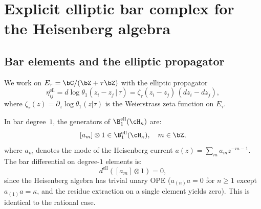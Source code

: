 \section{Explicit elliptic bar complex for the Heisenberg algebra}
\label{sec:elliptic-bar-heisenberg}

\subsection{Bar elements and the elliptic propagator}
\label{subsec:elliptic-bar-elements}

We work on $E_\tau = \bC / (\bZ + \tau\bZ)$ with the elliptic
propagator
\begin{equation}\label{eq:ell-propagator}
\eta_{ij}^{\mathrm{ell}}
= d\log\theta_1(z_i - z_j \,|\, \tau)
= \zeta_\tau(z_i - z_j)\,(dz_i - dz_j),
\end{equation}
where $\zeta_\tau(z) = \partial_z \log\theta_1(z|\tau)$ is the
Weierstrass zeta function on $E_\tau$.

\begin{computation}\label{comp:ell-bar-deg1}
In bar degree~$1$, the generators of $\B^{\mathrm{ell}}_1(\cH_\kappa)$
are:
\[
[a_m] \otimes 1 \in \B^{\mathrm{ell}}_1(\cH_\kappa), \quad m \in \bZ,
\]
where $a_m$ denotes the mode of the Heisenberg current $a(z) = \sum_m a_m z^{-m-1}$.
The bar differential on degree-$1$ elements is:
\[
d^{\mathrm{ell}}([a_m] \otimes 1) = 0,
\]
since the Heisenberg algebra has trivial unary OPE
($a_{(n)}a = 0$ for $n \geq 1$ except $a_{(1)}a = \kappa$, and
the residue extraction on a single element yields zero).
This is identical to the rational case.
\end{computation}

